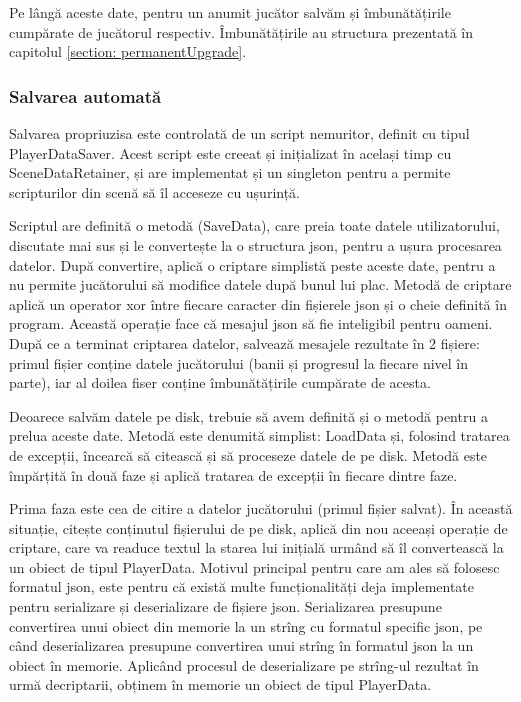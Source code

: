 \documentclass[12pt, a4paper]{article}
\begin{document}
	Pe lângă aceste date, pentru un anumit jucător salvăm și îmbunătățirile cumpărate de jucătorul respectiv. Îmbunătățirile au structura prezentată în capitolul \ref{section: permanentUpgrade}.
	
	
	
	
	
	\subsubsection{Salvarea automată}
	
	Salvarea propriuzisa este controlată de un script nemuritor, definit cu tipul PlayerDataSaver. Acest script este creeat și inițializat în același timp cu SceneDataRetainer, și are implementat și un singleton pentru a permite scripturilor din scenă să îl acceseze cu ușurință.
	\newline
	
	Scriptul are definită o metodă (SaveData), care preia toate datele utilizatorului, discutate mai sus și le convertește la o structura json, pentru a ușura procesarea datelor. După convertire, aplică o criptare simplistă peste aceste date, pentru a nu permite jucătorului să modifice datele după bunul lui plac. Metodă de criptare aplică un operator xor între fiecare caracter din fișierele json și o cheie definită în program. Această operație face că mesajul json să fie inteligibil pentru oameni. După ce a terminat criptarea datelor, salvează mesajele rezultate în 2 fișiere: primul fișier conține datele jucătorului (banii și progresul la fiecare nivel în parte), iar al doilea fiser conține îmbunătățirile cumpărate de acesta.
	\newline
	
	Deoarece salvăm datele pe disk, trebuie să avem definită și o metodă pentru a prelua aceste date. Metodă este denumită simplist: LoadData și, folosind tratarea de excepții, încearcă să citească și să proceseze datele de pe disk. Metodă este împărțită în două faze și aplică tratarea de excepții în fiecare dintre faze. 
	\newline
	
	Prima faza este cea de citire a datelor jucătorului (primul fișier salvat). În această situație, citește conținutul fișierului de pe disk, aplică din nou aceeași operație de criptare, care va readuce textul la starea lui inițială urmând să îl convertească la un obiect de tipul PlayerData. Motivul principal pentru care am ales să folosesc formatul json, este pentru că există multe funcționalități deja implementate pentru serializare și deserializare de fișiere json. Serializarea presupune convertirea unui obiect din memorie la un strîng cu formatul specific json, pe când deserializarea presupune convertirea unui strîng în formatul json la un obiect în memorie. Aplicând procesul de deserializare pe strîng-ul rezultat în urmă decriptarii, obținem în memorie un obiect de tipul PlayerData.
	\newline
	
\end{document}
